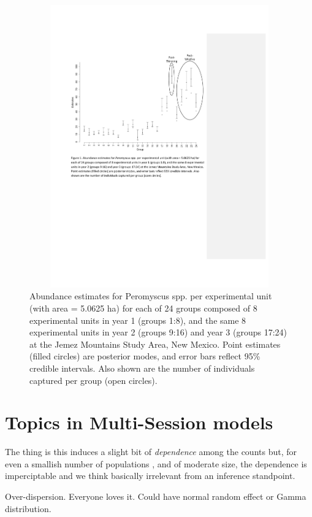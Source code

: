 \begin{figure}[htp]
\begin{center}
\includegraphics[height=4.8in,width=6.5in]{Ch13-Multisession/figs/figure_V2.pdf}
\end{center}
\caption{
Abundance estimates for Peromyscus spp. per experimental unit
(with area = 5.0625 ha) for each of 24 groups composed of 8
experimental units in year 1 (groups 1:8), and the same 8
experimental units in year 2 (groups 9:16) and year 3 (groups 17:24)
at the Jemez Mountains Study Area, New Mexico.  Point estimates
(filled circles) are posterior modes, and error bars reflect 95\%
credible intervals. Also shown are the number of individuals
captured per group (open circles).  }
\label{fig.fig1}
\end{figure}


\section{Topics in Multi-Session models}

The thing is this induces a slight bit of {\it dependence} among the
counts but, for even a smallish number of populations , and of
moderate size, the dependence is imperciptable and we think basically
irrelevant from an inference standpoint. 

Over-dispersion. Everyone loves it. Could have normal random effect or
Gamma distribution. 

